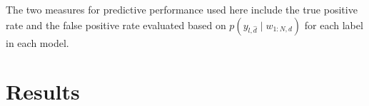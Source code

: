 \documentclass{article}
\begin{document}
The two measures for predictive performance used here include the
true positive rate and the false positive rate evaluated based on
$p\left(y_{l,\hat{d}}\mid w_{1:N,d}\right)$ for each label in each
model.

\section{Results}
\label{sec:results}

\begin{figure}[htbp]
\begin{center}

\end{center}
\end{figure}
\end{document}
